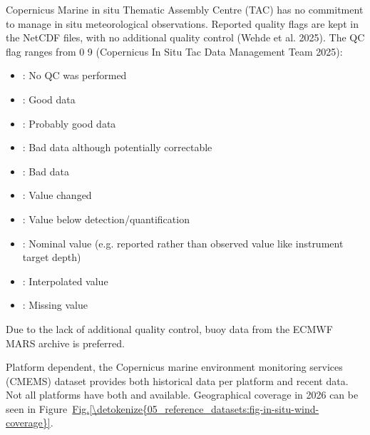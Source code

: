 \documentclass[a4paper,10pt,english]{sphinxmanual}
\begin{document}
\sphinxAtStartPar
Copernicus Marine in situ Thematic Assembly Centre (TAC) has no commitment to manage in situ meteorological observations. Reported quality flags are kept in the NetCDF files, with no additional quality control (Wehde et al. 2025). The QC flag ranges from 0 \textendash{} 9 (Copernicus In Situ Tac Data Management Team 2025):
\begin{itemize}
\item {} 
: No QC was performed

\item {} 
: Good data

\item {} 
: Probably good data

\item {} 
: Bad data although potentially correctable

\item {} 
: Bad data

\item {} 
: Value changed

\item {} 
: Value below detection/quantification

\item {} 
: Nominal value (e.g. reported rather than observed value like instrument target depth)

\item {} 
: Interpolated value

\item {} 
: Missing value

\end{itemize}

\sphinxAtStartPar
Due to the lack of additional quality control, buoy data from the ECMWF MARS archive is preferred.

\sphinxAtStartPar
{}

\sphinxAtStartPar
Platform dependent, the Copernicus marine environment monitoring services (CMEMS) dataset provides both historical data per platform and recent data. Not all platforms have both  and  available. Geographical coverage in 2026 can be seen in Figure \hyperref[\detokenize{05_reference_datasets:fig-in-situ-wind-coverage}]{Fig.\@ \ref{\detokenize{05_reference_datasets:fig-in-situ-wind-coverage}}}.
\end{document}
